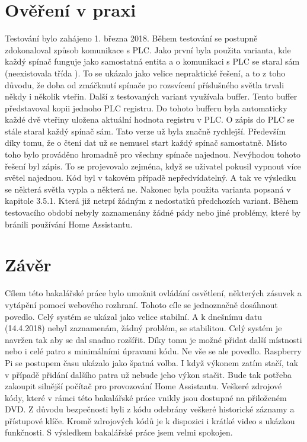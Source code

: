 \documentclass[a4paper,12pt,czech,bibliography=totoc]{scrbook}
\begin{document}
\chapter{Ověření v praxi}
Testování bylo zahájeno 1. března 2018. Během testování se postupně zdokonaloval způsob komunikace s PLC. Jako první byla použita varianta, kde každý spínač funguje jako samostatná entita a o komunikaci s PLC se staral sám (neexistovala třída ). To se ukázalo jako velice nepraktické řešení, a to z toho důvodu, že doba od zmáčknutí spínače po rozsvícení příslušného světla trvali někdy i několik vteřin. 
\newline
Další z testovaných variant využívala buffer. Tento buffer představoval kopii jednoho PLC registru. Do tohoto bufferu byla automaticky každé dvě vteřiny uložena aktuální hodnota registru v PLC. O zápis do PLC se stále staral každý spínač sám. Tato verze už byla značně rychlejší. Především díky tomu, že o čtení dat už se nemusel start každý spínač samostatně. Místo toho bylo prováděno hromadně pro všechny spínače najednou. Nevýhodou tohoto řešení byl zápis. To se projevovalo zejména, když se uživatel pokusil vypnout více světel najednou. Kód byl v takovém případě nepředvídatelný. A tak ve výsledku se některá světla vypla a některá ne.
\newline
Nakonec byla použita varianta popsaná v kapitole 3.5.1. Která již netrpí žádným z nedostatků předchozích variant.
\newline
Během testovacího období nebyly zaznamenány žádné pády nebo jiné problémy, které by bránili používání Home Assistantu.


 
\chapter{Závěr}
Cílem této bakalářské práce bylo umožnit ovládání osvětlení, některých zásuvek a vytápění pomocí webového rozhraní. Tohoto cíle se jednoznačně dosáhnout povedlo. Celý systém se ukázal jako velice stabilní. A k dnešnímu datu (14.4.2018) nebyl zaznamenám, žádný problém, se stabilitou. Celý systém je navržen tak aby se dal snadno rozšířit. Díky tomu je možné přidat další místnosti nebo i celé patro s minimálními úpravami kódu. Ne vše se ale povedlo. Raspberry Pi se postupem času ukázalo jako špatná volba. I když výkonem zatím stačí, tak v případě přidání dalšího patra už nebude jeho výkon stačit. Bude tak potřeba zakoupit silnější počítač pro provozování Home Assistantu.
\newline
\newline
Veškeré zdrojové kódy, které v rámci této bakalářské práce vnikly jsou dostupné na přiloženém DVD. Z důvodu bezpečnosti byli z kódu odebrány veškeré historické záznamy a přístupové klíče. Kromě zdrojových kódů je k dispozici i krátké video s ukázkou funkčnosti.
\newline
\newline
S výsledkem bakalářské práce jsem velmi spokojen.
\end{document}
